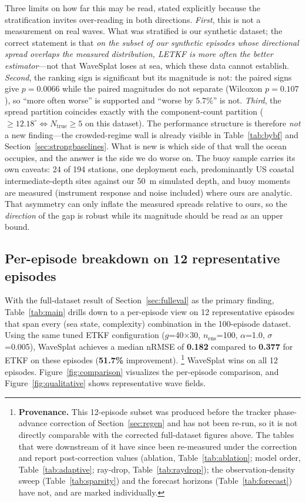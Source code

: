 Three limits on how far this may be read, stated explicitly because the
stratification invites over-reading in both directions.
\emph{First}, this is not a measurement on real waves. What was
stratified is our synthetic dataset; the correct statement is that
\emph{on the subset of our synthetic episodes whose directional spread
overlaps the measured distribution, LETKF is more often the better
estimator}---not that WaveSplat loses at sea, which these data cannot
establish.
\emph{Second}, the ranking sign is significant but its magnitude is not: the
paired signs give $p=0.0066$ while the paired magnitudes do not separate
(Wilcoxon $p=0.107$), so ``more often worse'' is supported and ``worse by
$5.7\%$'' is not.
\emph{Third}, the spread partition coincides exactly with the
component-count partition ($\geq12.18^\circ \Leftrightarrow N_{\text{true}}
\geq 5$ on this dataset).  The performance structure is therefore \emph{not}
a new finding---the crowded-regime wall is already visible in
Table~\ref{tab:bybf} and Section~\ref{sec:strongbaselines}.  What is new is
which side of that wall the ocean occupies, and the answer is the side we do
worse on.
The buoy sample carries its own caveats: 24 of 194 stations, one deployment
each, predominantly US coastal intermediate-depth sites against our 50~m
simulated depth, and buoy moments are measured (instrument response and noise
included) where ours are analytic.  That asymmetry can only inflate the
measured spreads relative to ours, so the \emph{direction} of the gap is
robust while its magnitude should be read as an upper bound.

\subsection{Per-episode breakdown on 12 representative episodes}
\label{subsec:per_episode}

With the full-dataset result of Section~\ref{sec:fulleval} as the
primary finding, Table~\ref{tab:main} drills down to a per-episode
view on 12 representative episodes that span every (sea state,
complexity) combination in the 100-episode dataset.
Using the same tuned ETKF configuration
($g$=40$\times$30, $n_{\text{ens}}$=100, $\alpha$=1.0, $\sigma$=0.005),
WaveSplat achieves a median nRMSE of \textbf{0.182} compared to
\textbf{0.377} for ETKF on these episodes (\textbf{51.7\%}
improvement).%
\footnote{\textbf{Provenance.} This 12-episode subset was produced before
the tracker phase-advance correction of Section~\ref{sec:regen} and has
not been re-run, so it is not directly comparable with the corrected
full-dataset figures above.  The tables that were downstream of it have
since been re-measured under the correction and report post-correction
values (ablation, Table~\ref{tab:ablation}; model order,
Table~\ref{tab:adaptive}; ray-drop, Table~\ref{tab:raydrop}); the
observation-density sweep (Table~\ref{tab:sparsity}) and the forecast
horizons (Table~\ref{tab:forecast}) have not, and are marked
individually.}
WaveSplat wins on all 12 episodes.
Figure~\ref{fig:comparison} visualizes the per-episode comparison, and
Figure~\ref{fig:qualitative} shows representative wave fields.

